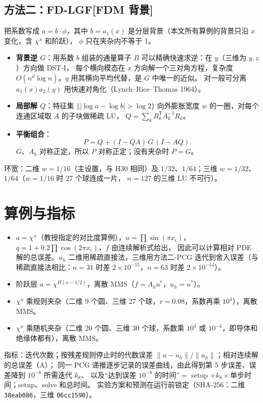 \documentclass[11pt,a4paper]{ctexart}
\newcommand{\Mtwo}{方法二}
\begin{document}
\subsection{\Mtwo{}：FD-LGF[FDM 背景]}
把系数写成 $a=b\cdot\phi$，其中 $b=a_1(x)$ 是分层背景（本文所有算例的背景只沿 $x$ 变化，含 $\chi^x$ 和阶跃），
$\phi$ 只在夹杂内不等于 1。
\begin{itemize}
\item \textbf{背景逆 $G$}：用系数 $b$ 组装的通量算子 $B$ 可以精确快速求逆：在 $y$（三维为 $y,z$）方向做 DST-I，
  每个横向模态在 $x$ 方向解一个三对角方程，复杂度 $O(n^d\log n)$。$q$ 用其横向平均代替，是 $G$ 中唯一的近似。
  对一般可分离 $a_1(x)a_2(y)$ 用快速对角化（Lynch--Rice--Thomas 1964）。
\item \textbf{局部解 $Q$}：特征集 $\{|\log a-\log b|>\log 2\}$ 向外膨胀宽度 $w$ 的一圈，对每个连通区域取 $A$ 的子块做稀疏 LU，
  $Q=\sum_k R_k^{\mathsf T}A_k^{-1}R_k$。
\item \textbf{平衡组合}：
  \[ P=Q+(I-QA)\,G\,(I-AQ). \]
  $G$、$A_k$ 对称正定，所以 $P$ 对称正定；没有夹杂时 $P=G$。
\end{itemize}
环宽：二维 $w=1/16$（主设置，与 H30 相同）及 $1/32$、$1/64$；三维 $w=1/32$、$1/64$（$w=1/16$ 时 27 个球连成一片，
$n=127$ 的三维 LU 不可行）。

\section{算例与指标}
\begin{itemize}
\item[A] $a=\chi^x$（教授指定的对比度算例），$u=\prod\sin(\pi x_i)$，$q=1+0.2\prod\cos(2\pi x_i)$，$f$ 由连续解析式给出，
  因此可以计算相对 PDE 解的总误差。$u_h$ 二维用稀疏直接法，三维用\Mtwo{}-PCG 迭代到舍入误差（与稀疏直接法相比：$n=31$ 时差 $2\times10^{-15}$，$n=63$ 时差 $2\times10^{-14}$）。
\item[B] 阶跃层 $a=\chi^{H(x-1/2)}$，离散 MMS（$f=A_hu^*$，$u_h=u^*$）。
\item[C] $\chi^x$ 乘规则夹杂（二维 9 个圆、三维 27 个球，$r=0.08$，系数再乘 $10^4$），离散 MMS。
\item[D] $\chi^x$ 乘随机夹杂（二维 20 个圆、三维 30 个球，系数乘 $10^4$ 或 $10^{-4}$，即导体和绝缘体都有），离散 MMS。
\end{itemize}
指标：迭代次数；按残差规则停止时的代数误差 $\|u-u_h\|/\|u_h\|$；相对连续解的总误差（A）；
同一 PCG 递推逐步记录的误差曲线，由此得到第 5 步误差、误差降到 $10^{-8}$ 所需迭代 $k_8$、
以及“达到误差 $10^{-8}$ 的时间”$=$ setup $+k_8\times$单步时间；setup、solve 和总时间。
实验方案和预测在运行前锁定（SHA-256：二维 \texttt{38eab086}，三维 \texttt{06cc1590}）。
\end{document}
